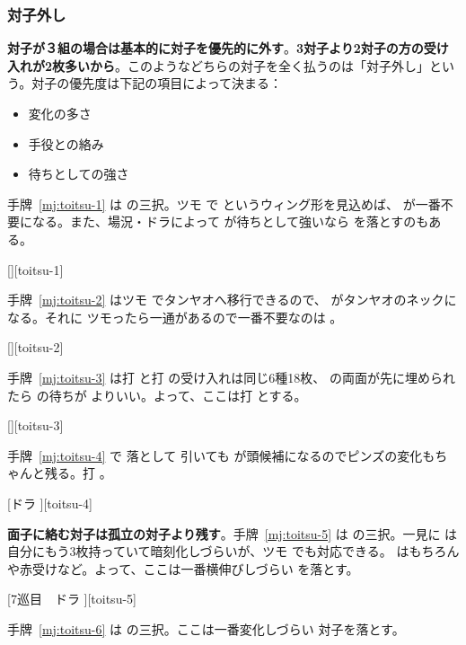 \documentclass[../nankiru_main.tex]{subfiles}
\begin{document}
\subsubsection*{対子外し}

\textbf{対子が３組の場合は基本的に対子を優先的に外す}\citep{gendai-toitsu}。\textbf{3対子より2対子の方の受け入れが2枚多いから}\citep[][p.~34]{uzaku-haikouritsu}。このようなどちらの対子を全く払うのは「対子外し」という\citep{nemata-13}。対子の優先度は下記の項目によって決まる：

\begin{itemize}
\item 変化の多さ
\item 手役との絡み
\item 待ちとしての強さ
\end{itemize}

手牌~\ref{mj:toitsu-1} は  の三択。ツモ  で  というウィング形を見込めば、 が一番不要になる。また、場況・ドラによって  が待ちとして強いなら  を落とすのもある。

[][toitsu-1]

手牌~\ref{mj:toitsu-2} はツモ  でタンヤオへ移行できるので、 がタンヤオのネックになる。それに  ツモったら一通があるので一番不要なのは 。

[][toitsu-2]

手牌~\ref{mj:toitsu-3} は打  と打  の受け入れは同じ6種18枚、 の両面が先に埋められたら  の待ちが  よりいい。よって、ここは打  とする。

[][toitsu-3]

手牌~\ref{mj:toitsu-4} で  落として  引いても  が頭候補になるのでピンズの変化もちゃんと残る。打 。

[ドラ ][toitsu-4]

\textbf{面子に絡む対子は孤立の対子より残す}\citep[][pp.~78--79]{fkt}。手牌~\ref{mj:toitsu-5} は  の三択。一見に  は自分にもう3枚持っていて暗刻化しづらいが、ツモ  でも対応できる。 はもちろん  や赤受けなど。よって、ここは一番横伸びしづらい  を落とす。

[7巡目　ドラ ][toitsu-5]

手牌~\ref{mj:toitsu-6} は  の三択。ここは一番変化しづらい  対子を落とす\citep[][pp.~80--81]{fkt}。
\end{document}
